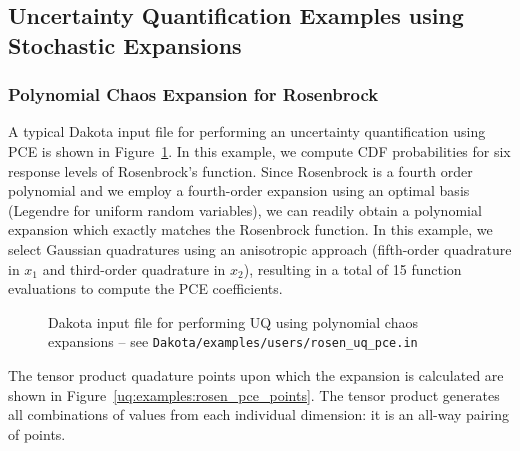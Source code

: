 \subsection{Uncertainty Quantification Examples using Stochastic Expansions} \label{uq:stoch_exp:ex}

\subsubsection{Polynomial Chaos Expansion for Rosenbrock}
\label{uq:stoch_exp:ex:pce}


A typical Dakota input file for performing an uncertainty
quantification using PCE is shown in
Figure~\ref{uq:examples:pce_input}.  In this example, we compute CDF
probabilities for six response levels of Rosenbrock's function. Since
Rosenbrock is a fourth order polynomial and we employ a fourth-order
expansion using an optimal basis (Legendre for uniform random
variables), we can readily obtain a polynomial expansion which exactly
matches the Rosenbrock function. In this example, we select Gaussian
quadratures using an anisotropic approach (fifth-order quadrature in
$x_1$ and third-order quadrature in $x_2$), resulting in a total of 15
function evaluations to compute the PCE coefficients.

\begin{figure}[htbp!]
  \centering
  \begin{bigbox}
    \begin{small}
    \end{small}
  \end{bigbox}
\caption{Dakota input file for performing UQ using polynomial chaos expansions --
see \texttt{Dakota/examples/users/rosen\_uq\_pce.in} }
\label{uq:examples:pce_input}
\end{figure}

The tensor product quadature points upon which the expansion is calculated 
are shown in Figure~\ref{uq:examples:rosen_pce_points}. 
The tensor product generates
all combinations of values from each individual dimension: it is an 
all-way pairing of points.

